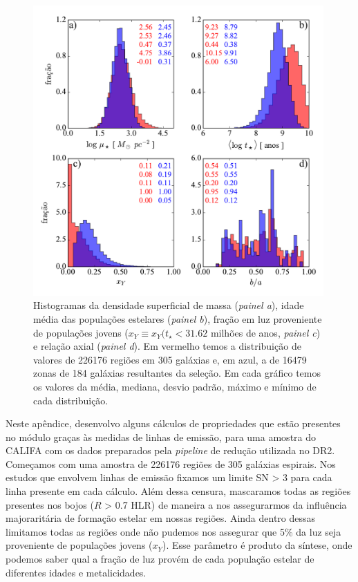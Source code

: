 \begin{figure}
	\centering
	\includegraphics[width=0.99\textwidth]{figuras/histosample.pdf}
	\caption[Histogramas: densidade superficial de massa, idade média, fração de populações jovens e
	relação axial.]
	{Histogramas da densidade superficial de massa ({\em painel a}), idade média das populações
estelares ({\em painel b}), fração em luz proveniente de populações jovens ($x_Y \equiv x_Y(t_\star <
31.62$ milhões de anos, {\em painel c}) e relação axial ({\em painel d}). Em vermelho temos a
distribuição de valores de 226176 regiões em 305 galáxias e, em azul, a de 16479 zonas de 184
galáxias resultantes da seleção. Em cada gráfico temos os valores da média, mediana, desvio padrão,
máximo e mínimo de cada distribuição.}
	\label{fig:histosample}
\end{figure}

Neste apêndice, desenvolvo alguns cálculos de propriedades que estão presentes no módulo \emldc graças às medidas de linhas de emissão, para uma amostra do CALIFA com os dados preparados pela {\em pipeline} de redução utilizada no DR2. Começamos com uma amostra de 226176 regiões de 305 galáxias espirais. Nos estudos que envolvem linhas de emissão fixamos um limite SN > 3 para cada linha presente em cada cálculo. Além dessa censura, mascaramos todas as regiões presentes nos bojos ($R$ > 0.7 HLR) de maneira a nos assegurarmos da influência majoraritária de formação estelar em nossas regiões. Ainda dentro dessas limitamos todas as regiões onde não pudemos nos assegurar que 5\% da luz seja proveniente de populações jovens ($x_Y$). Esse parâmetro é produto da síntese, onde podemos saber qual a fração de luz provém de cada população estelar de diferentes idades e metalicidades.

